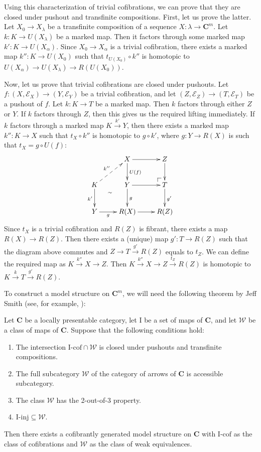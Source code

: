 \documentclass[reqno]{amsart}
\makeatletter
\theoremstyle{definition}
\theoremstyle{remark}
\newcommand{\cat}[1]{\mathbf{#1}}
\newcommand{\C}{\cat{C}}
\newcommand{\we}{\mathcal{W}}
\newcommand{\I}{\mathrm{I}}
\newcommand{\class}[2]{#1\text{-}\mathrm{#2}}
\newcommand{\Icof}[1][\I]{\class{#1}{cof}}
\newcommand{\Iinj}[1][\I]{\class{#1}{inj}}
\numberwithin{figure}{section}
\newcommand{\po}[1][dr]{\save*!/#1+1.2pc/#1:(1,-1)@^{|-}\restore}
\makeatother
\begin{document}
Using this characterization of trivial cofibrations, we can prove that they are closed under pushout and transfinite compositions.
First, let us prove the latter.
Let $X_0 \to X_\lambda$ be a transfinite composition of a sequence $X : \lambda \to \C^m$.
Let $k : K \to U(X_\lambda)$ be a marked map.
Then it factors through some marked map $k' : K \to U(X_\alpha)$.
Since $X_0 \to X_\alpha$ is a trivial cofibration, there exists a marked map $k'' : K \to U(X_0)$
such that $t_{U(X_0)} \circ k''$ is homotopic to $U(X_\alpha) \to U(X_\lambda) \to R(U(X_0))$.

Now, let us prove that trivial cofibrations are closed under pushouts.
Let $f : (X,\mathcal{E}_X) \to (Y,\mathcal{E}_Y)$ be a trivial cofibration,
and let $(Z,\mathcal{E}_Z) \to (T,\mathcal{E}_T)$ be a pushout of $f$.
Let $k : K \to T$ be a marked map.
Then $k$ factors through either $Z$ or $Y$.
If $k$ factors through $Z$, then this gives us the required lifting immediately.
If $k$ factors through a marked map $K \xrightarrow{k'} Y$, then there exists a marked map $k'' : K \to X$
such that $t_X \circ k''$ is homotopic to $g \circ k'$, where $g : Y \to R(X)$ is such that $t_X = g \circ U(f)$:
\[ \xymatrix{ \ar@{}[rdd]_(0.6){\sim}           & X \ar[r] \ar[d]^{U(f)} & Z \ar[d] \\
              K \ar[d]_{k'} \ar@{-->}[ur]^{k''} & Y \ar[r] \ar[d]^g      & \po T \ar[d]^{g'} \\
              Y \ar[r]_-g                       & R(X) \ar[r]            & R(Z)
            } \]
Since $t_X$ is a trivial cofibration and $R(Z)$ is fibrant, there exists a map $R(X) \to R(Z)$.
Then there exists a (unique) map $g' : T \to R(Z)$ such that the diagram above commutes and $Z \to T \xrightarrow{g'} R(Z)$ equals to $t_Z$.
We can define the required map as $K \xrightarrow{k''} X \to Z$.
Then $K \xrightarrow{k''} X \to Z \xrightarrow{t_Z} R(Z)$ is homotopic to $K \xrightarrow{k} T \xrightarrow{g'} R(Z)$.

To construct a model structure on $\C^m$, we will need the following theorem by Jeff Smith (see, for example, \cite[Proposition~A.2.6.8]{lurie-topos}):
\begin{thm}
Let $\C$ be a locally presentable category, let $\I$ be a set of maps of $\C$, and let $\we$ be a class of maps of $\C$.
Suppose that the following conditions hold:
\begin{enumerate}
\item The intersection $\Icof \cap \we$ is closed under pushouts and transfinite compositions.
\item The full subcategory $\we$ of the category of arrows of $\C$ is accessible subcategory.
\item The class $\we$ has the 2-out-of-3 property.
\item $\Iinj \subseteq \we$.
\end{enumerate}
Then there exists a cofibrantly generated model structure on $\C$ with $\Icof$ as the class of cofibrations and $\we$ as the class of weak equivalences.
\end{thm}
\end{document}

